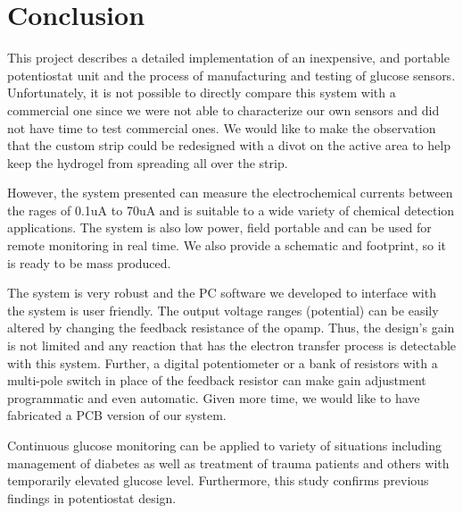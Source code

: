 \section{Conclusion}

This project describes a detailed implementation of an inexpensive, and portable potentiostat unit and the process of manufacturing and testing of glucose sensors. Unfortunately, it is not possible to directly compare this system with a commercial one since we were not able to characterize our own sensors and did not have time to test commercial ones. We would like to make the observation that the custom strip could be redesigned with a divot on the active area to help keep the hydrogel from spreading all over the strip.

However, the system presented can measure the electrochemical currents between the rages of 0.1uA to 70uA and is suitable to a wide variety of chemical detection applications. The system is also low power, field portable and can be used for remote monitoring in real time. We also provide a schematic and footprint, so it is ready to be mass produced. 

The system is very robust and the PC software we developed to interface with the system is user friendly. The output voltage ranges (potential) can be easily altered by changing the feedback resistance of the opamp. Thus, the design's gain is not limited and any reaction that has the electron transfer process is detectable with this system. Further, a digital potentiometer or a bank of resistors with a multi-pole switch in place of the feedback resistor can make gain adjustment programmatic and even automatic. Given more time, we would like to have fabricated a PCB version of our system.

Continuous glucose monitoring can be applied to variety of situations including management of diabetes as well as treatment of trauma patients and others with temporarily elevated glucose level.  Furthermore, this study confirms previous findings in potentiostat design.